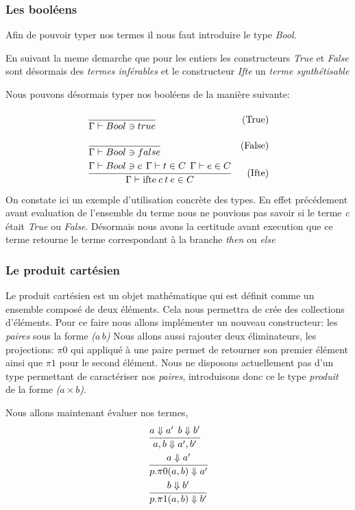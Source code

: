 \documentclass {article}
\theoremstyle{definition}
\theoremstyle{remark}
\begin{document}
\subsubsection{Les booléens}

Afin de pouvoir typer nos termes il nous faut introduire le type \emph{Bool}.


En suivant la meme demarche que  pour les entiers les 
constructeurs \emph{True} et \emph{False} sont désormais des \emph{termes inférables}
et le constructeur \emph{Ifte} un \emph{terme synthétisable}



Nous pouvons désormais typer nos booléens de la manière suivante:
\begin{align*}
  &\cfrac{}
  {\Gamma\vdash Bool \ni true}&\mbox{(True)} \\
  &\cfrac{}
  {\Gamma\vdash Bool \ni false}&\mbox{(False)} \\
  &\cfrac{\Gamma\vdash Bool \ni c \:\: \Gamma\vdash t \in C \:\: \Gamma\vdash e \in C}
  {\Gamma\vdash \mathrm{ifte}\: c\: t\: e\in C}&\mbox{(Ifte)}
\end{align*}

On constate ici un exemple d'utilisation concrète des types. En effet 
précédement avant evaluation de l'ensemble du terme nous ne pouvions 
pas savoir si le terme \emph{c} était \emph{True} ou \emph{False}.
Désormais nous avons la certitude avant execution que ce terme retourne 
le terme correspondant à la branche \emph{then} ou \emph{else}

\subsubsection{Le produit cartésien}
\label{produit_cartesien}

Le produit cartésien est un objet mathématique qui est définit comme
un ensemble composé de deux éléments.
Cela nous permettra de crée des collections d'éléments. 
Pour ce faire nous allons implémenter un nouveau constructeur:
les \emph{paires} sous la forme \emph{($a\,b$)}
Nous allons aussi rajouter deux éliminateurs, les projections:
\emph{$\pi 0$} qui appliqué à une paire 
permet de retourner son premier élément ainsi que \emph{$\pi 1$} pour le second élément.
Nous ne disposons actuellement pas d'un type permettant de caractériser nos \emph{paires},
introduisons donc ce le type \emph{produit} de la forme \emph{($a\times b$)}.

Nous allons maintenant évaluer nos termes, 
\begin{align*}
  &\cfrac{a \Downarrow a' \:\: b\Downarrow b'}
  {a,b \Downarrow a',b'}\\
  &\cfrac{a\Downarrow a'}
  {p.\pi0(a,b)\Downarrow a'}\\
  &\cfrac{b\Downarrow b'}
  {p.\pi1(a,b)\Downarrow b'}\\
\end{align*}
\end{document}
